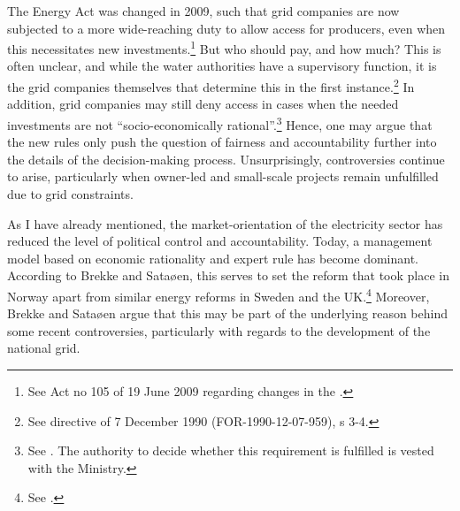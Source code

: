 The Energy Act was changed in 2009, such that grid companies are now subjected to a more wide-reaching duty to allow access for producers, even when this necessitates new investments.\footnote{See Act no 105 of 19 June 2009 regarding changes in the \cite{ea90}.} But who should pay, and how much? This is often unclear, and while the water authorities have a supervisory function, it is the grid companies themselves that determine this in the first instance.\footnote{See directive of 7 December 1990 (FOR-1990-12-07-959), s 3-4.} In addition, grid companies may still deny access in cases when the needed investments are not ``socio-economically rational''.\footnote{See \cite[3-4]{ea90}. The authority to decide whether this requirement is fulfilled is vested with the Ministry.} Hence, one may argue that the new rules only push the question of fairness and accountability further into the details of the decision-making process. Unsurprisingly, controversies continue to arise, particularly when owner-led and small-scale projects remain unfulfilled due to grid constraints.


As I have already mentioned, the market-orientation of the electricity sector has reduced the level of political control and accountability. Today, a management model based on economic rationality and expert rule has become dominant. According to Brekke and Sataøen, this serves to set the reform that took place in Norway apart from similar energy reforms in Sweden and the UK.\footnote{See \cite{brekke12}.} Moreover, Brekke and Sataøen argue that this may be part of the underlying reason behind some recent controversies, particularly with regards to the development of the national grid. 

